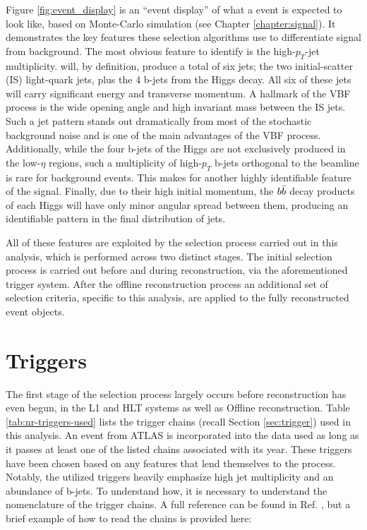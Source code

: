     Figure \ref{fig:event_display} is an ``event display'' of what a \vbfhhproc event is expected to look like,
        based on Monte-Carlo simulation (see Chapter \ref{chapter:signal}).
    It demonstrates the key features these selection algorithms use to differentiate signal from background.
    The most obvious feature to identify is the high-$p_T$-jet multiplicity.
    \vbfproc will, by definition, produce a total of six jets;
        the two initial-scatter (IS) light-quark jets, plus the 4 b-jets from the Higgs decay.
    All six of these jets will carry significant energy and transverse momentum.
    A hallmark of the VBF process is the wide opening angle and high invariant mass between the IS jets.
    Such a jet pattern stands out dramatically from most of the stochastic background noise
        and is one of the main advantages of the VBF process.
    Additionally, while the four b-jets of the Higgs are not exclusively produced in the low-$\eta$ regions,
        such a multiplicity of high-$p_T$ b-jets orthogonal to the beamline is rare for background events.
    This makes for another highly identifiable feature of the signal.
    Finally, due to their high initial momentum,
        the $b \bar{b}$ decay products of each Higgs will have only minor angular spread between them,
        producing an identifiable pattern in the final distribution of jets.

    All of these features are exploited by the selection process carried out in this analysis,
        which is performed across two distinct stages.
    The initial selection process is carried out before and during reconstruction, via the aforementioned trigger system.
    After the offline reconstruction process an additional set of selection criteria,
        specific to this analysis, are applied to the fully reconstructed event objects.
    
    \pagebreak
    \section{Triggers}
        
        The first stage of the selection process largely occurs before reconstruction has even begun,
            in the L1 and HLT systems as well as Offline reconstruction.
        Table \ref{tab:nr-triggers-used} lists the trigger chains (recall Section \ref{sec:trigger}) used in this analysis.
        An event from ATLAS is incorporated into the data used as long as it passes at least one 
            of the listed chains associated with its year.
        These triggers have been chosen based on any features that lend themselves to the \vbfproc process.
        Notably, the utilized triggers heavily emphasize high jet multiplicity and an abundance of b-jets.
        To understand how, it is necessary to understand the nomenclature of the trigger chains.
        A full reference can be found in Ref. \cite{trigger_naming},
            but a brief example of how to read the chains is provided here:

